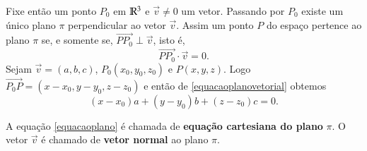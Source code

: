 Fixe ent\~ao um ponto $P_0$ em $\mathbb{R}^3$ e $\vec{v}\ne 0$ um vetor. Passando por $P_0$ existe um \'unico plano $\pi$ perpendicular ao vetor $\vec{v}$. Assim um ponto $P$ do espa\c{c}o pertence ao plano $\pi$ se, e somente se, $\vec{PP_0} \perp \vec{v}$, isto \'e,
\begin{equation}\label{equacaoplanovetorial}
    \vec{PP_0}\cdot\vec{v} = 0.
\end{equation}
Sejam $\vec{v} = (a,b,c)$, $P_0(x_0, y_0, z_0)$ e $P(x, y, z)$. Logo $\vec{P_0P} = (x - x_0, y - y_0, z - z_0)$ e ent\~ao de \eqref{equacaoplanovetorial} obtemos
\begin{equation}\label{equacaoplano}
    (x - x_0)a + (y - y_0)b + (z - z_0)c = 0.
\end{equation}

A equa\c{c}\~ao \eqref{equacaoplano} \'e chamada de \textbf{equa\c{c}\~ao cartesiana do plano} $\pi$. O vetor $\vec{v}$ \'e chamado de \textbf{vetor normal} ao plano $\pi$.

